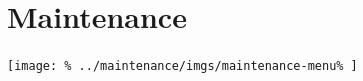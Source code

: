 \documentclass[../main/main]{subfiles}
\begin{document}
\newpage
\chapter{Maintenance}
\texttt{[image: \%
  ../maintenance/imgs/maintenance-menu\%
]}
\end{document}
